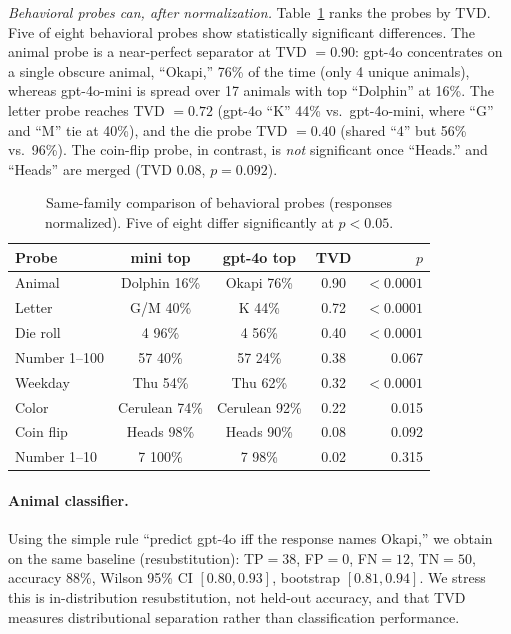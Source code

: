 \documentclass[11pt]{article}
\begin{document}
\emph{Behavioral probes can, after normalization.} Table~\ref{tab:tvd} ranks the probes by TVD. Five of eight behavioral probes show statistically significant differences. The animal probe is a near-perfect separator at TVD $=0.90$: gpt-4o concentrates on a single obscure animal, ``Okapi,'' 76\% of the time (only 4 unique animals), whereas gpt-4o-mini is spread over 17 animals with top ``Dolphin'' at 16\%. The letter probe reaches TVD $=0.72$ (gpt-4o ``K'' 44\% vs.\ gpt-4o-mini, where ``G'' and ``M'' tie at 40\%), and the die probe TVD $=0.40$ (shared ``4'' but 56\% vs.\ 96\%). The coin-flip probe, in contrast, is \emph{not} significant once ``Heads.'' and ``Heads'' are merged (TVD 0.08, $p=0.092$).

\begin{table}[h]
\centering
\small
\begin{tabular}{lcccr}
\toprule
Probe & mini top & gpt-4o top & TVD & $p$ \\
\midrule
Animal & Dolphin 16\% & Okapi 76\% & 0.90 & $<0.0001$ \\
Letter & G/M 40\% & K 44\% & 0.72 & $<0.0001$ \\
Die roll & 4 96\% & 4 56\% & 0.40 & $<0.0001$ \\
Number 1--100 & 57 40\% & 57 24\% & 0.38 & 0.067 \\
Weekday & Thu 54\% & Thu 62\% & 0.32 & $<0.0001$ \\
Color & Cerulean 74\% & Cerulean 92\% & 0.22 & 0.015 \\
Coin flip & Heads 98\% & Heads 90\% & 0.08 & 0.092 \\
Number 1--10 & 7 100\% & 7 98\% & 0.02 & 0.315 \\
\bottomrule
\end{tabular}
\caption{Same-family comparison of behavioral probes (responses normalized). Five of eight differ significantly at $p<0.05$.}\label{tab:tvd}
\end{table}

\paragraph{Animal classifier.} Using the simple rule ``predict gpt-4o iff the response names Okapi,'' we obtain on the same baseline (resubstitution): TP$=38$, FP$=0$, FN$=12$, TN$=50$, accuracy $88\%$, Wilson 95\% CI $[0.80,0.93]$, bootstrap $[0.81,0.94]$. We stress this is in-distribution resubstitution, not held-out accuracy, and that TVD measures distributional separation rather than classification performance.
\end{document}
